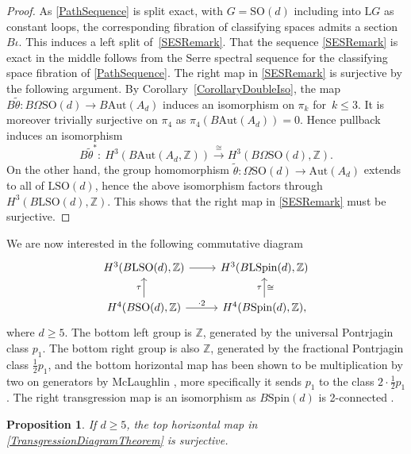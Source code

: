 \documentclass[pdftex]{sigma}
\numberwithin{equation}{section}
\newtheorem{Proposition}[Theorem]{Proposition}
\newcommand{\Z}{\mathbb{Z}}
\newcommand{\SO}{\mathrm{SO}}
\newcommand{\Aut}{\mathrm{Aut}}
\newcommand{\Spin}{\mathrm{Spin}}
\renewcommand{\L}{\mathrm{L}}
\begin{document}
\begin{proof}
As \eqref{PathSequence} is split exact, with $G = \SO(d)$ including into $\L G$ as constant loops, the corresponding fibration of classifying spaces admits a section $B\iota$.
This induces a left split of~\eqref{SESRemark}.
That the sequence \eqref{SESRemark} is exact in the middle follows from the Serre spectral sequence for the classifying space fibration of \eqref{PathSequence}.
The right map in \eqref{SESRemark} is surjective by the following argument.
By Corollary~\ref{CorollaryDoubleIso}, the map $B\tilde{\theta}\colon B\Omega \SO(d) \to B \Aut(A_d)$ induces an isomorphism on $\pi_k$ for~$k \leq 3$.
It is moreover trivially surjective on $\pi_4$ as $\pi_4(B\Aut(A_d)) = 0$.
Hence pullback induces an isomorphism
\begin{equation*}
 B\tilde{\theta}^* \colon\ H^3(B \Aut(A_d, \Z)) \stackrel{\cong}{\longrightarrow} H^3(B\Omega \SO(d), \Z).
\end{equation*}
On the other hand, the group homomorphism $\tilde{\theta} \colon \Omega \SO(d) \to \Aut(A_d)$ extends to all of $\L \SO(d)$, hence the above isomorphism factors through $H^3(B\L \SO(d), \Z)$.
This shows that the right map in \eqref{SESRemark} must be surjective.
\end{proof}

We are now interested in the following commutative diagram
\begin{equation}\label{TransgressionDiagramTheorem}
\begin{tikzcd}
 H^3(B\L\SO(d), \Z) \ar[r] & H^3(B\L\Spin(d), \Z) \\
 H^4(B\SO(d), \Z) \ar[u, "\tau"] \ar[r, "\cdot 2"] & H^4(B\Spin(d), \Z), \ar[u, "\tau", "\cong"']
\end{tikzcd}
\end{equation}
where $d\geq 5$.
The bottom left group is $\Z$, generated by the universal Pontrjagin class $p_1$.
The bottom right group is also $\Z$, generated by the fractional Pontrjagin class $\frac{1}{2} p_1$, and the bottom horizontal map has been shown to be multiplication by two on generators by McLaughlin \cite[proof of Lemma~2.2]{McLaughlin}, more specifically it sends $p_1$ to the class $2 \cdot \frac{1}{2} p_1$.
The right transgression map is an isomorphism as $B\Spin(d)$ is 2-connected \cite[p.~149]{McLaughlin}.

\begin{Proposition} \label{PropCommDiagramH3Transgression}
If $d \geq 5$, the top horizontal map in \eqref{TransgressionDiagramTheorem} is surjective.
\end{Proposition}
\end{document}
